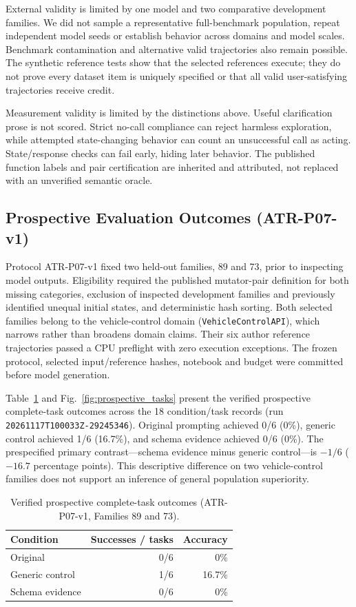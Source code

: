 \documentclass[conference]{IEEEtran}
\newcommand{\code}[1]{\texttt{#1}}
\begin{document}
External validity is limited by one model and two comparative development families. We did not sample a representative full-benchmark population, repeat independent model seeds or establish behavior across domains and model scales. Benchmark contamination and alternative valid trajectories also remain possible. The synthetic reference tests show that the selected references execute; they do not prove every dataset item is uniquely specified or that all valid user-satisfying trajectories receive credit.

Measurement validity is limited by the distinctions above. Useful clarification prose is not scored. Strict no-call compliance can reject harmless exploration, while attempted state-changing behavior can count an unsuccessful call as acting. State/response checks can fail early, hiding later behavior. The published function labels and pair certification are inherited and attributed, not replaced with an unverified semantic oracle.

\subsection{Prospective Evaluation Outcomes (ATR-P07-v1)}
Protocol ATR-P07-v1 fixed two held-out families, 89 and 73, prior to inspecting model outputs. Eligibility required the published mutator-pair definition for both missing categories, exclusion of inspected development families and previously identified unequal initial states, and deterministic hash sorting. Both selected families belong to the vehicle-control domain (\code{VehicleControlAPI}), which narrows rather than broadens domain claims. Their six author reference trajectories passed a CPU preflight with zero execution exceptions. The frozen protocol, selected input/reference hashes, notebook and budget were committed before model generation.

Table~\ref{tab:prospective_results} and Fig.~\ref{fig:prospective_tasks} present the verified prospective complete-task outcomes across the 18 condition/task records (run \code{20261117T100033Z-29245346}). Original prompting achieved 0/6 (0\%), generic control achieved 1/6 (16.7\%), and schema evidence achieved 0/6 (0\%). The prespecified primary contrast---schema evidence minus generic control---is $-1/6$ ($-16.7$ percentage points). This descriptive difference on two vehicle-control families does not support an inference of general population superiority.

\begin{table}[t]\caption{Verified prospective complete-task outcomes (ATR-P07-v1, Families 89 and 73).}\label{tab:prospective_results}\centering
\begin{tabular}{lrr}\toprule
Condition & Successes / tasks & Accuracy\\\midrule
Original & 0/6 & 0\%\\
Generic control & 1/6 & 16.7\%\\
Schema evidence & 0/6 & 0\%\\\bottomrule
\end{tabular}
\end{table}
\end{document}
